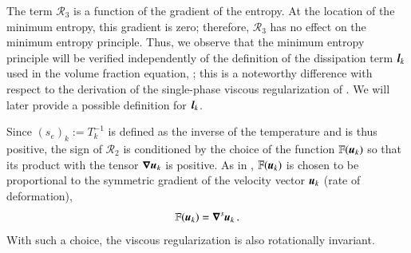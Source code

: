 The term ${\mathcal{R}_3}$ is a function of the gradient of the entropy.  
At the location of the minimum entropy, this gradient is zero; therefore, $\mathcal{R}_3$ 
has no effect on the minimum entropy principle. Thus, we observe that the minimum entropy principle will be verified
independently of the definition of the dissipation term $\boldsymbol l_k$ used in the volume fraction
equation, ; this is a noteworthy difference with respect to the derivation of the 
single-phase viscous regularization of \cite{jlg_VR_SIAM_2004,Marco_paper_low_mach}. We will later provide a possible definition for $\boldsymbol l_k$.

Since $(s_e)_k:=T_k^{-1}$ is defined as the inverse of the temperature and is thus positive, the sign of $\mathcal{R}_2$ is 
conditioned by the choice of the function $\mathbb{F}(\boldsymbol u_k)$ so that its product with the tensor $\boldsymbol\nabla \boldsymbol u_k$ is 
positive. As in \cite{jlg_VR_SIAM_2004,Marco_paper_low_mach}, $\mathbb{F}(\boldsymbol u_k)$ is chosen to be proportional to the symmetric 
gradient of the velocity vector $\boldsymbol u_k$ (rate of deformation),
\begin{equation}
\mathbb{F}(\boldsymbol u_k) = \boldsymbol\nabla^s \boldsymbol u_k \,.
\end{equation}
With such a choice, the viscous regularization is also rotationally invariant.

